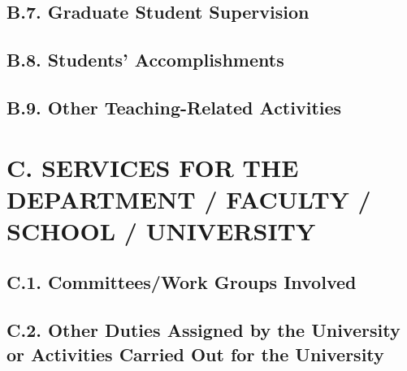 \documentclass[12pt]{article}
\begin{document}

\subsection*{B.7. Graduate Student Supervision}


\subsection*{B.8. Students’ Accomplishments}

\subsection*{B.9. Other Teaching-Related Activities}


\section*{C. SERVICES FOR THE DEPARTMENT / FACULTY / SCHOOL / UNIVERSITY}

\subsection*{C.1. Committees/Work Groups Involved}


\subsection*{C.2. Other Duties Assigned by the University or Activities Carried Out for the University}
\end{document}
